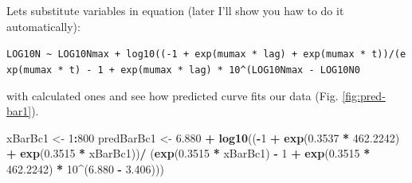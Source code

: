 \documentclass[]{book}
\newenvironment{Shaded}{\begin{snugshade}}{\end{snugshade}}
\newcommand{\KeywordTok}[1]{\textcolor[rgb]{0.13,0.29,0.53}{\textbf{#1}}}
\newcommand{\DecValTok}[1]{\textcolor[rgb]{0.00,0.00,0.81}{#1}}
\newcommand{\FloatTok}[1]{\textcolor[rgb]{0.00,0.00,0.81}{#1}}
\newcommand{\StringTok}[1]{\textcolor[rgb]{0.31,0.60,0.02}{#1}}
\newcommand{\OperatorTok}[1]{\textcolor[rgb]{0.81,0.36,0.00}{\textbf{#1}}}
\newcommand{\NormalTok}[1]{#1}
\theoremstyle{definition}
\theoremstyle{definition}
\theoremstyle{definition}
\theoremstyle{remark}
\begin{document}
\begin{Shaded}
\end{Shaded}

Lets substitute variables in equation (later I'll show you haw to do it
automatically):

\texttt{LOG10N\ \textasciitilde{}\ LOG10Nmax\ +\ log10((-1\ +\ exp(mumax\ *\ lag)\ +\ exp(mumax\ *\ t))/(exp(mumax\ *\ t)\ -\ 1\ +\ exp(mumax\ *\ lag)\ *\ 10\^{}(LOG10Nmax\ -\ LOG10N0}

with calculated ones and see how predicted curve fits our data (Fig.
\ref{fig:pred-bar1}).

\begin{Shaded}
\begin{Highlighting}[]
\NormalTok{xBarBc1 <-}\StringTok{ }\DecValTok{1}\OperatorTok{:}\DecValTok{800}
\NormalTok{predBarBc1 <-}\StringTok{ }\FloatTok{6.880} \OperatorTok{+}
\StringTok{  }\KeywordTok{log10}\NormalTok{((}\OperatorTok{-}\DecValTok{1} \OperatorTok{+}\StringTok{ }\KeywordTok{exp}\NormalTok{(}\FloatTok{0.3537} \OperatorTok{*}\StringTok{ }\FloatTok{462.2242}\NormalTok{) }\OperatorTok{+}
\StringTok{           }\KeywordTok{exp}\NormalTok{(}\FloatTok{0.3515} \OperatorTok{*}\StringTok{ }\NormalTok{xBarBc1))}\OperatorTok{/}
\StringTok{          }\NormalTok{(}\KeywordTok{exp}\NormalTok{(}\FloatTok{0.3515} \OperatorTok{*}\StringTok{ }\NormalTok{xBarBc1) }\OperatorTok{-}\StringTok{ }\DecValTok{1} \OperatorTok{+}\StringTok{ }
\StringTok{             }\KeywordTok{exp}\NormalTok{(}\FloatTok{0.3515} \OperatorTok{*}\StringTok{ }\FloatTok{462.2242}\NormalTok{) }\OperatorTok{*}\StringTok{ }\DecValTok{10}\OperatorTok{^}\NormalTok{(}\FloatTok{6.880} \OperatorTok{-}\StringTok{ }\FloatTok{3.406}\NormalTok{)))}
\end{Highlighting}
\end{Shaded}

\begin{Shaded}
\end{Shaded}
\end{document}
